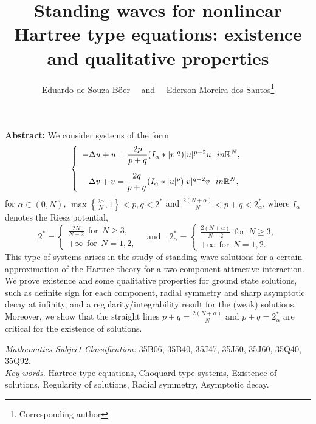 \documentclass[12pt,a4paper]{article}
\numberwithin{equation}{section}
\begin{document}
 	\title{Standing waves for nonlinear Hartree type equations: existence and qualitative properties
		}
	\author{
		Eduardo de Souza B\"oer \ \ and \ \  Ederson Moreira dos Santos\thanks{Corresponding author}}
			\date{}	
	\maketitle
	
\noindent \textbf{Abstract:} We consider systems of the form
$$ \left\{ \begin{array}{l}
-\Delta u + u = \dfrac{2p}{p+q}(I_\alpha \ast |v|^{q})|u|^{p-2}u \ \ \textrm{ in } \mathbb{R}^N, \vspace{10pt} \\
-\Delta v + v = \dfrac{2q}{p+q}(I_\alpha \ast |u|^{p})|v|^{q-2}v \ \ \textrm{ in } \mathbb{R}^N, 
\end{array} \right. $$
for $\alpha\in (0, N)$, $\max\left\{\frac{2\alpha}{N}, 1\right\} < p, q < 2^*$ and $\frac{2(N+\alpha)}{N} < p+ q < 2^{*}_{\alpha}$, where $I_\alpha$ denotes the Riesz potential,
\[
2^* = \left\{ \begin{array}{l}\frac{2N}{N-2} \ \ \text{for} \ \ N\geq 3,\\ +\infty \ \ \text{for} \ \ N =1,2, \end{array}\right. \quad \text{and} \quad 2^*_{\alpha} = \left\{ \begin{array}{l}\frac{2(N+\alpha)}{N-2} \ \ \text{for} \ \ N\geq 3,\\ +\infty \ \ \text{for} \ \ N =1,2. \end{array} \right.
\]
This type of systems arises in the study of standing wave solutions for a certain approximation of the Hartree theory for a two-component attractive interaction. We prove existence and some qualitative \linebreak properties for ground state solutions, such as definite sign for each component, radial symmetry and sharp asymptotic decay at infinity, and a regularity/integrability result for the (weak) solutions. Moreover, we show that the straight lines $p+q=\frac{2(N+\alpha)}{N}$ and $ p+ q = 2^{*}_{\alpha}$ are critical for the existence of solutions.

\vspace{0.5 cm}

\noindent
{\it \small Mathematics Subject Classification:} {\small 35B06, 35B40, 35J47, 35J50, 35J60, 35Q40, 35Q92. }\\
		{\it \small Key words}. {\small  Hartree type equations, Choquard type systems, Existence of solutions, Regularity of solutions, Radial symmetry, Asymptotic decay.}
			
\end{document}
